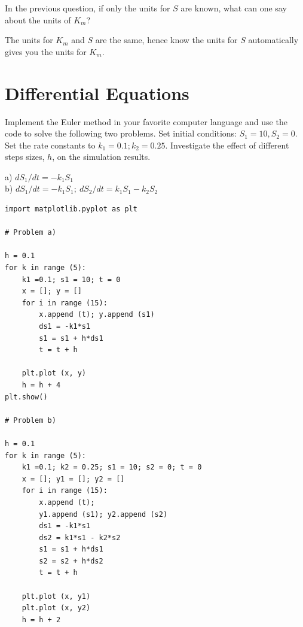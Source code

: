 \documentclass[12pt]{article}
\newcommand{\dt}{d\!t}
\newcommand{\dS}{d\!S}
\begin{document}
\begin{question}
In the previous question, if only the units for $S$ are known, what can one say about the units of $K_m$?
\end{question}
\begin{solution}
The units for $K_m$ and $S$ are the same, hence know the units for $S$ automatically gives you the units for $K_m$.
\end{solution}




\section{Differential Equations}


\begin{question}
Implement the Euler method in your favorite computer language and use the code to solve the following two problems. Set initial conditions: $S_1 = 10, S_2 = 0$. Set the rate constants to $k_1 = 0.1; k_2 = 0.25$. Investigate the effect of different steps sizes, $h$, on the simulation results.

\medskip
a) $\dS_1/\dt = -k_1 S_1 $ \\

b) $\dS_1/\dt = -k_1 S_1;\ \dS_2/\dt = k_1 S_1 - k_2 S_2$
\end{question}
\cprotEnv\begin{solution}
\begin{verbatim}
import matplotlib.pyplot as plt

# Problem a)

h = 0.1
for k in range (5):
    k1 =0.1; s1 = 10; t = 0
    x = []; y = []
    for i in range (15):
        x.append (t); y.append (s1)
        ds1 = -k1*s1
        s1 = s1 + h*ds1
        t = t + h

    plt.plot (x, y)
    h = h + 4
plt.show()

# Problem b)

h = 0.1
for k in range (5):
    k1 =0.1; k2 = 0.25; s1 = 10; s2 = 0; t = 0
    x = []; y1 = []; y2 = []
    for i in range (15):
        x.append (t);
        y1.append (s1); y2.append (s2)
        ds1 = -k1*s1
        ds2 = k1*s1 - k2*s2
        s1 = s1 + h*ds1
        s2 = s2 + h*ds2
        t = t + h

    plt.plot (x, y1)
    plt.plot (x, y2)
    h = h + 2
\end{verbatim}
\end{solution}
\end{document}

